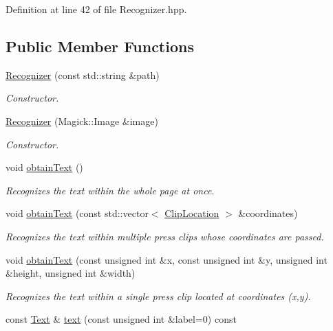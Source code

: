 Definition at line 42 of file Recognizer.hpp.\subsection*{Public Member Functions}
\begin{CompactItemize}
\item 
\hyperlink{class_recognizer_50ffc181208bb07ae651aba6249ee7e4}{Recognizer} (const std::string \&path)
\begin{CompactList}\small\item\em Constructor. \item\end{CompactList}\item 
\hyperlink{class_recognizer_01e0b85a6ad9cfbf6fcab4fe4b294640}{Recognizer} (Magick::Image \&image)
\begin{CompactList}\small\item\em Constructor. \item\end{CompactList}\item 
void \hyperlink{class_recognizer_008a0ea69a912ff54882dd20d18adcf9}{obtainText} ()
\begin{CompactList}\small\item\em Recognizes the text within the whole page at once. \item\end{CompactList}\item 
void \hyperlink{class_recognizer_4b3b27b3746edcf831d142eddfb81f19}{obtainText} (const std::vector$<$ \hyperlink{class_clip_location}{ClipLocation} $>$ \&coordinates)
\begin{CompactList}\small\item\em Recognizes the text within multiple press clips whose coordinates are passed. \item\end{CompactList}\item 
void \hyperlink{class_recognizer_d117f344b1f77711e6cbab0f15dbc269}{obtainText} (const unsigned int \&x, const unsigned int \&y, unsigned int \&height, unsigned int \&width)
\begin{CompactList}\small\item\em Recognizes the text within a single press clip located at coordinates (x,y). \item\end{CompactList}\item 
const \hyperlink{class_text}{Text} \& \hyperlink{class_recognizer_c5d20b511888a60a6c1a81c0a4206ec2}{text} (const unsigned int \&label=0) const 

\end{CompactItemize}
